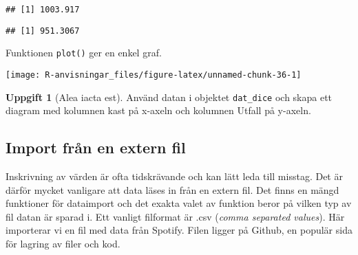 \documentclass[
]{book}
\newenvironment{Shaded}{\begin{snugshade}}{\end{snugshade}}
\newcommand{\FunctionTok}[1]{\textcolor[rgb]{0.13,0.29,0.53}{\textbf{#1}}}
\newcommand{\NormalTok}[1]{#1}
\newcommand{\SpecialCharTok}[1]{\textcolor[rgb]{0.81,0.36,0.00}{\textbf{#1}}}
\theoremstyle{definition}
\theoremstyle{definition}
\theoremstyle{definition}
\newtheorem{exercise}{Uppgift}[chapter]
\theoremstyle{definition}
\theoremstyle{remark}
\begin{document}
\begin{verbatim}
## [1] 1003.917
\end{verbatim}

\begin{Shaded}
\end{Shaded}

\begin{verbatim}
## [1] 951.3067
\end{verbatim}

Funktionen \texttt{plot()} ger en enkel graf.

\begin{Shaded}
\end{Shaded}

\begin{center}\texttt{[image: R-anvisningar\_files/figure-latex/unnamed-chunk-36-1]} \end{center}

\begin{exercise}[Alea iacta est]

Använd datan i objektet \texttt{dat\_dice} och skapa ett diagram med kolumnen kast på x-axeln och kolumnen Utfall på y-axeln.

\begin{Shaded}
\end{Shaded}

\end{exercise}

\hypertarget{import-fruxe5n-en-extern-fil}{%
\subsection{Import från en extern fil}\label{import-fruxe5n-en-extern-fil}}

Inskrivning av värden är ofta tidskrävande och kan lätt leda till misstag. Det är därför mycket vanligare att data läses in från en extern fil. Det finns en mängd funktioner för dataimport och det exakta valet av funktion beror på vilken typ av fil datan är sparad i. Ett vanligt filformat är .csv (\emph{comma separated values}). Här importerar vi en fil med data från Spotify. Filen ligger på Github, en populär sida för lagring av filer och kod.
\end{document}

